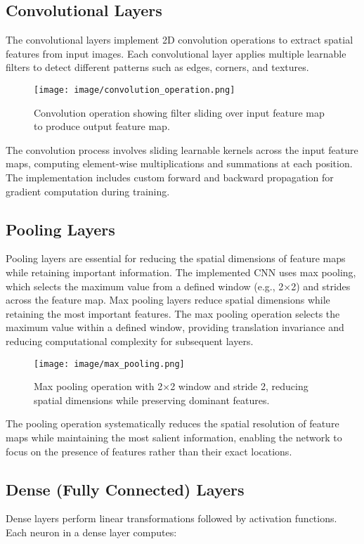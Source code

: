 \documentclass[conference]{IEEEtran}
\begin{document}
\subsection{Convolutional Layers}
The convolutional layers implement 2D convolution operations to extract spatial features from input images. Each convolutional layer applies multiple learnable filters to detect different patterns such as edges, corners, and textures.

\begin{figure}[htbp]
\centerline{\texttt{[image: image/convolution\_operation.png]}}
\caption{Convolution operation showing filter sliding over input feature map to produce output feature map.}
\label{fig:convolution}
\end{figure}

The convolution process involves sliding learnable kernels across the input feature maps, computing element-wise multiplications and summations at each position. The implementation includes custom forward and backward propagation for gradient computation during training.

\subsection{Pooling Layers}
Pooling layers are essential for reducing the spatial dimensions of feature maps while retaining important information. The implemented CNN uses max pooling, which selects the maximum value from a defined window (e.g., 2×2) and strides across the feature map.
Max pooling layers reduce spatial dimensions while retaining the most important features. The max pooling operation selects the maximum value within a defined window, providing translation invariance and reducing computational complexity for subsequent layers.

\begin{figure}[htbp]
\centerline{\texttt{[image: image/max\_pooling.png]}}
\caption{Max pooling operation with 2×2 window and stride 2, reducing spatial dimensions while preserving dominant features.}
\label{fig:pooling}
\end{figure}

The pooling operation systematically reduces the spatial resolution of feature maps while maintaining the most salient information, enabling the network to focus on the presence of features rather than their exact locations.

\subsection{Dense (Fully Connected) Layers}
Dense layers perform linear transformations followed by activation functions. Each neuron in a dense layer computes:
\end{document}
